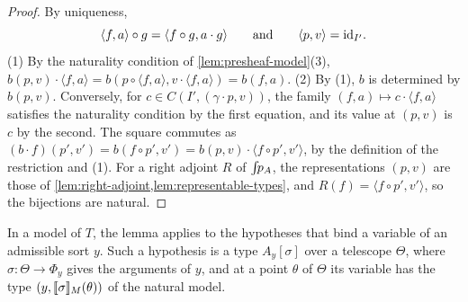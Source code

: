 \begin{proof}
    By uniqueness,
    \[
        \langle f, a \rangle \circ g = \langle f \circ g, a \cdot g \rangle \qquad \text{and} \qquad \langle p, v \rangle = \mathrm{id}_{I'}.
    \]
    (1) By the naturality condition of \cref{lem:presheaf-model}(3), $b(p, v) \cdot \langle f, a \rangle = b(p \circ \langle f, a \rangle, v \cdot \langle f, a \rangle) = b(f, a)$. (2) By (1), $b$ is determined by $b(p, v)$. Conversely, for $c \in C(I', (\gamma \cdot p, v))$, the family $(f, a) \mapsto c \cdot \langle f, a \rangle$ satisfies the naturality condition by the first equation, and its value at $(p, v)$ is $c$ by the second. The square commutes as $(b \cdot f)(p', v') = b(f \circ p', v') = b(p, v) \cdot \langle f \circ p', v' \rangle$, by the definition of the restriction and (1). For a right adjoint $R$ of $\int\!\!p_A$, the representations $(p, v)$ are those of \cref{lem:right-adjoint,lem:representable-types}, and $R(f) = \langle f \circ p', v' \rangle$, so the bijections are natural.
\end{proof}

In a model of $T$, the lemma applies to the hypotheses that bind a variable of an admissible sort $y$. Such a hypothesis is a type $A_y[\sigma]$ over a telescope $\Theta$, where $\sigma : \Theta \to \Phi_y$ gives the arguments of $y$, and at a point $\theta$ of $\Theta$ its variable has the type $(y, \llbracket\sigma\rrbracket_M(\theta))$ of the natural model.

